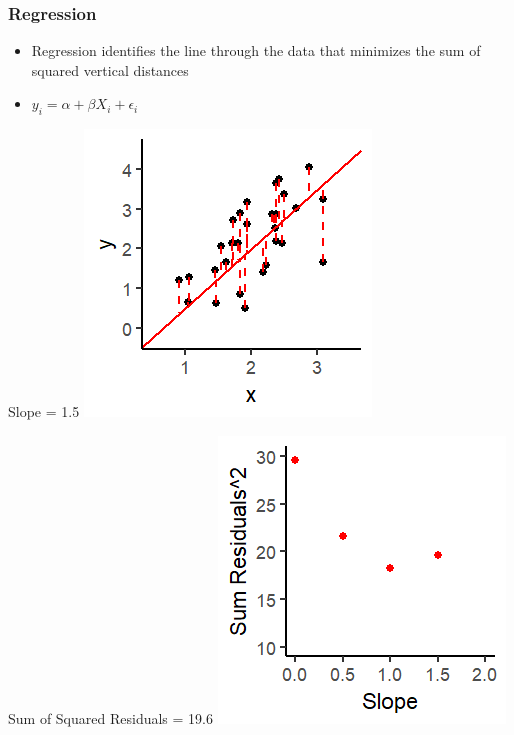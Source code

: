 \documentclass[xcolor=x11names,compress]{beamer}\usepackage[]{graphicx}\usepackage[]{color}
\makeatletter
\def\maxwidth{ %
  \ifdim\Gin@nat@width>\linewidth
    \linewidth
  \else
    \Gin@nat@width
  \fi
}
\newenvironment{knitrout}{}{} %
\renewcommand{\(}{\begin{columns}}
\renewcommand{\)}{\end{columns}}
\newcommand{\<}[1]{\begin{column}{#1}}
\renewcommand{\>}{\end{column}}
\makeatother
\begin{document}
\begin{frame}
\frametitle{Regression}
\begin{itemize}
\item Regression identifies the line through the data that minimizes the sum of squared vertical distances 
\item $y_i = \alpha + \beta X_i + \epsilon_i$
\end{itemize}
\begin{multicols}{2}
Slope = 1.5
\begin{knitrout}
\color{fgcolor}
\includegraphics[width=\maxwidth]{figure/graph_ols4-1} 

\end{knitrout}
\columnbreak
Sum of Squared Residuals = 19.6
\begin{knitrout}
\color{fgcolor}
\includegraphics[width=\maxwidth]{figure/graph_ssr4-1} 

\end{knitrout}
\end{multicols}
\end{frame}
\end{document}

